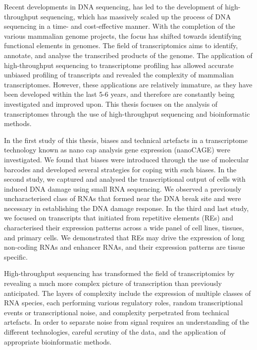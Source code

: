 Recent developments in DNA sequencing, has led to the development of high-throughput sequencing, which has massively scaled up the process of DNA sequencing in a time- and cost-effective manner. With the completion of the various mammalian genome projects, the focus has shifted towards identifying functional elements in genomes. The field of transcriptomics aims to identify, annotate, and analyse the transcribed products of the genome. The application of high-throughput sequencing to transcriptome profiling has allowed accurate unbiased profiling of transcripts and revealed the complexity of mammalian transcriptomes. However, these applications are relatively immature, as they have been developed within the last 5-6 years, and therefore are constantly being investigated and improved upon. This thesis focuses on the analysis of transcriptomes through the use of high-throughput sequencing and bioinformatic methods.

In the first study of this thesis, biases and technical artefacts in a transcriptome technology known as nano cap analysis gene expression (nanoCAGE) were investigated. We found that biases were introduced through the use of molecular barcodes and developed several strategies for coping with such biases. In the second study, we captured and analysed the transcriptional output of cells with induced DNA damage using small RNA sequencing. We observed a previously uncharacterised class of RNAs that formed near the DNA break site and were necessary in establishing the DNA damage response. In the third and last study, we focused on transcripts that initiated from repetitive elements (REs) and characterised their expression patterns across a wide panel of cell lines, tissues, and primary cells. We demonstrated that REs may drive the expression of long non-coding RNAs and enhancer RNAs, and their expression patterns are tissue specific.

High-throughput sequencing has transformed the field of transcriptomics by revealing a much more complex picture of transcription than previously anticipated. The layers of complexity include the expression of multiple classes of RNA species, each performing various regulatory roles, random transcriptional events or transcriptional noise, and complexity perpetrated from technical artefacts. In order to separate noise from signal requires an understanding of the different technologies, careful scrutiny of the data, and the application of appropriate bioinformatic methods.
